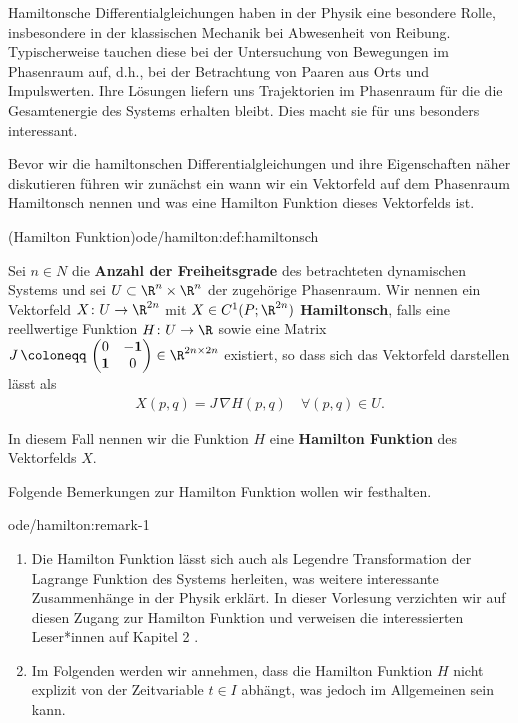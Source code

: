 \documentclass[letterpaper,10pt,german]{jupyterBook}
\begin{document}
\par
Hamiltonsche Differentialgleichungen haben in der Physik eine besondere Rolle, insbesondere in der klassischen Mechanik bei Abwesenheit von Reibung.
Typischerweise tauchen diese bei der Untersuchung von Bewegungen im Phasenraum auf, d.h., bei der Betrachtung von Paaren aus Orts  und Impulswerten.
Ihre Lösungen liefern uns Trajektorien im Phasenraum für die die Gesamtenergie des Systems erhalten bleibt.
Dies macht sie für uns besonders interessant.

\par
Bevor wir die hamiltonschen Differentialgleichungen und ihre Eigenschaften näher diskutieren führen wir zunächst ein wann wir ein Vektorfeld auf dem Phasenraum Hamiltonsch nennen und was eine Hamilton Funktion dieses Vektorfelds ist.
\begin{definition}{(Hamilton Funktion)}{ode/hamilton:def:hamiltonsch}



\par
Sei \(n \in N\) die \textbf{Anzahl der Freiheitsgrade} des betrachteten dynamischen Systems und sei \(U\subset \R^n \times \R^n\) der zugehörige Phasenraum.
Wir nennen ein Vektorfeld \(X \colon U \rightarrow \R^{2n}\) mit \(X \in C^1(P;\R^{2n})\) \textbf{Hamiltonsch}, falls eine reellwertige Funktion \(H \colon U \rightarrow \R\) sowie eine Matrix \(J \, \coloneqq \, \begin{pmatrix}0 & -\mathbf{1}\\ \mathbf{1} & 0 \end{pmatrix} \in \R^{2n \times 2n}\) existiert, so dass sich das Vektorfeld darstellen lässt als
\begin{align}\label{equation:ode/hamilton:eq:hamilton_Gleichung}
X(p,q) = J \, \nabla H (p,q) \quad \forall (p,q) \in U.
\end{align}
\par
In diesem Fall nennen wir die Funktion \(H\) eine \textbf{Hamilton Funktion} des Vektorfelds \(X\).
\end{definition}

\par
Folgende Bemerkungen zur Hamilton Funktion wollen wir festhalten.
\begin{remark}{}{ode/hamilton:remark-1}


\begin{enumerate}

\item {} 
\par
Die Hamilton Funktion lässt sich auch als Legendre Transformation der Lagrange Funktion des Systems herleiten, was weitere interessante Zusammenhänge in der Physik erklärt.
In dieser Vorlesung verzichten wir auf diesen Zugang zur Hamilton Funktion und verweisen die interessierten Leser*innen auf Kapitel 2 \cite{Nol11}.

\item {} 
\par
Im Folgenden werden wir annehmen, dass die Hamilton Funktion \(H\) nicht explizit von der Zeitvariable \(t \in I\) abhängt, was jedoch im Allgemeinen sein kann.

\end{enumerate}
\end{remark}
\end{document}

